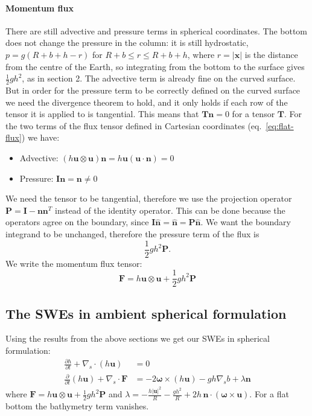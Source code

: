 \paragraph{Momentum flux}
There are still advective and pressure terms in spherical coordinates. The bottom does not change the pressure in the column: it is still hydrostatic, $p = g(R + b + h - r)$ for $R + b\leq r\leq R + b + h$, where $r = |\mathbf{x}|$ is the distance from the centre of the Earth, so integrating from the bottom to the surface gives $\frac12gh^2$, as in section 2. The advective term is already fine on the curved surface. But in order for the pressure term to be correctly defined on the curved surface we need the divergence theorem to hold, and it only holds if each row of the tensor it is applied to is tangential. This means that $\mathbf{T}\mathbf{n} = 0$ for a tensor $\mathbf{T}$. For the two terms of the flux tensor defined in Cartesian coordinates (eq.~\ref{eq:flat-flux}) we have:
\begin{itemize}
    \item Advective: $(h\mathbf{u}\otimes\mathbf{u})\mathbf{n} = h\mathbf{u}(\mathbf{u}\cdot\mathbf{n}) = 0$
    \item Pressure: $\mathbf{I}\mathbf{n} = \mathbf{n}\neq0$
\end{itemize}
We need the tensor to be tangential, therefore we use the projection operator $\mathbf{P} = \mathbf{I} - \mathbf{n}\mathbf{n}^T$ instead of the identity operator. This can be done because the operators agree on the boundary, since $\mathbf{I}\hat{\mathbf{n}} = \hat{\mathbf{n}} = \mathbf{P}\hat{\mathbf{n}}$. We want the boundary integrand to be unchanged, therefore the pressure term of the flux is
\begin{equation*}
    \frac12gh^2\mathbf{P}.
\end{equation*}
We write the momentum flux tensor:
\begin{equation}\label{eq:sph-flux}
    \mathbf{F} = h\mathbf{u}\otimes\mathbf{u} + \frac12gh^2\mathbf{P}
\end{equation}

\subsection{The SWEs in ambient spherical formulation}
Using the results from the above sections we get our SWEs in spherical formulation:
\begin{align}
    \frac{\partial h}{\partial t} + \nabla_s\cdot(h\mathbf{u}) &= 0 \label{eq:system1}\\
    \frac{\partial}{\partial t}(h\mathbf{u}) + \nabla_s\cdot\mathbf{F} &= -2\boldsymbol{\omega}\times(h\mathbf{u}) - gh\nabla_s b + \lambda\mathbf{n} \label{eq:system2}
\end{align}
where $\mathbf{F} = h\mathbf{u}\otimes\mathbf{u} + \frac12gh^2\mathbf{P}$ and $\lambda = -\frac{h|\mathbf{u}|^2}{R} - \frac{gh^2}{R} + 2h\,\mathbf{n}\cdot(\boldsymbol{\omega}\times\mathbf{u})$. For a flat bottom the bathymetry term vanishes.

